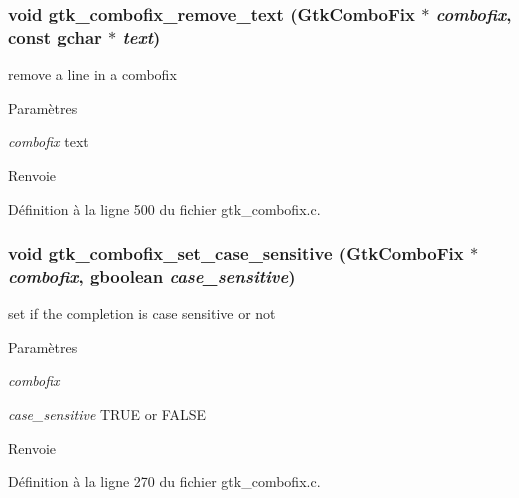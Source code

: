 \subsubsection[{gtk\_\-combofix\_\-remove\_\-text}]{\setlength{\rightskip}{0pt plus 5cm}void gtk\_\-combofix\_\-remove\_\-text ({\bf GtkComboFix} $\ast$ {\em combofix}, \/  const gchar $\ast$ {\em text})}\label{gtk__combofix_8h_a0b47a7c0d8c8cc2772313880d2f2b0e1}
remove a line in a combofix


\begin{DoxyParams}{Paramètres}
\item[{\em combofix}]text\end{DoxyParams}
\begin{DoxyReturn}{Renvoie}

\end{DoxyReturn}


Définition à la ligne 500 du fichier gtk\_\-combofix.c.

\subsubsection[{gtk\_\-combofix\_\-set\_\-case\_\-sensitive}]{\setlength{\rightskip}{0pt plus 5cm}void gtk\_\-combofix\_\-set\_\-case\_\-sensitive ({\bf GtkComboFix} $\ast$ {\em combofix}, \/  gboolean {\em case\_\-sensitive})}\label{gtk__combofix_8h_ac7743a3ebf76e8dc9203d696dbc02cae}
set if the completion is case sensitive or not


\begin{DoxyParams}{Paramètres}
\item[{\em combofix}]\item[{\em case\_\-sensitive}]TRUE or FALSE\end{DoxyParams}
\begin{DoxyReturn}{Renvoie}

\end{DoxyReturn}


Définition à la ligne 270 du fichier gtk\_\-combofix.c.

